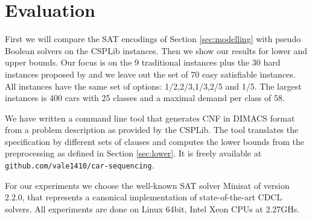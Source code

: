 \documentclass[]{llncs}
\begin{document}

\section{Evaluation}
\label{sec:experiments}
                                                                      
First we will compare the SAT encodings of Section \ref{sec:modelling} with pseudo Boolean solvers on the CSPLib
instances. Then we show our results for lower and upper bounds. Our focus is on the 9 traditional instances plus the 30
hard instances proposed by \cite{Gravel05} and we leave out the set of 70 easy satisfiable instances. All instances have
the same set of options: 1/2,2/3,1/3,2/5 and 1/5. The largest instances is 400 cars with 25 classes and a maximal demand
per class of 58. 

We have written a command line tool that generates CNF in DIMACS format from a problem description as provided by the
CSPLib. The tool translates the specification by different sets of clauses and computes the lower bounds from the
preprocessing as defined in Section \ref{sec:lower}. It is freely available at \\
\verb+github.com/vale1410/car-sequencing+.

For our experiments we choose the well-known SAT solver Minisat \cite{Een03} of version 2.2.0, that represents a
canonical implementation of state-of-the-art CDCL solvers. All experiments are done on Linux 64bit, Intel Xeon CPUs at
2.27GHs. 
\end{document}
